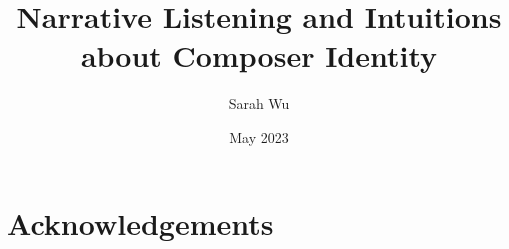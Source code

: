 \documentclass[12pt,twoside]{reedthesis}
\title{Narrative Listening and Intuitions about Composer Identity}
\author{Sarah Wu}
\date{May 2023}
\begin{document}
  \maketitle
  \frontmatter %
  \pagestyle{empty} %

    \chapter*{Acknowledgements}





	

	
	

\end{document}
